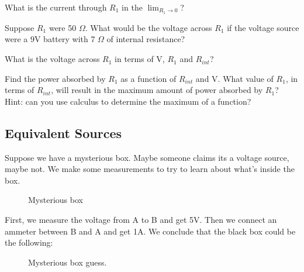 \begin{blevel}
What is the current through $R_1$ in the $\lim_{R_1 \to 0}$? 
\end{blevel}

\begin{blevel}
Suppose $R_1$ were 50 $\Omega$. What would be the voltage across $R_1$ if the voltage source were a 9V battery with 7 $\Omega$ of internal resistance?  
\end{blevel}

\begin{blevel}
What is the voltage across $R_1$ in terms of V, $R_1$ and $R_{int}$? 
\end{blevel}

\begin{clevel}
Find the power absorbed by $R_1$ as a function of $R_{int}$ and V. What value of $R_1$, in terms of $R_{int}$, will result in the maximum amount of power absorbed by $R_1$? Hint: can you use calculus to determine the maximum of a function?
\end{clevel}

\subsection{Equivalent Sources}
Suppose we have a mysterious box. Maybe someone claims its a voltage source, maybe not. We make some measurements to try to learn about what's inside the box. 

\begin{figure}[H]
\begin{center}
\caption{Mysterious box}
\end{center}
\end{figure}

First, we measure the voltage from A to B and get 5V. Then we connect an ammeter between B and A and get 1A. We conclude that the black box could be the following:
\par
\begin{figure}[H]
\begin{center}
\caption{Mysterious box guess.}
\label{F:4TH}
\end{center}
\end{figure}

